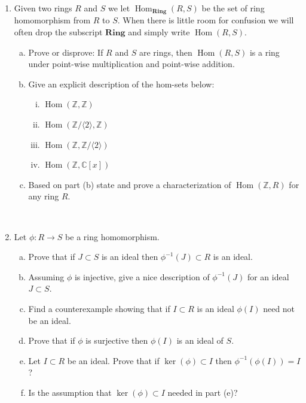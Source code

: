 \documentclass[12pt]{amsart}
\newcommand{\ZZ}{\mathbb{Z}}
\newcommand{\CC}{\mathbb{C}}
\newcommand{\Ring}{\textbf{Ring}}
\newcommand{\Hom}{\operatorname{Hom}}
\renewcommand{\ker}{\operatorname{ker}}
\begin{document}
\begin{enumerate}
	\item Given two rings $R$ and $S$ we let $\Hom_{\Ring}(R,S)$ be the set of ring homomorphism from $R$ to $S$. When there is little room for confusion we will often drop the subscript $\Ring$ and simply write $\Hom(R,S)$. 
	\begin{enumerate}[(a)]
		\item Prove or disprove: If $R$ and $S$ are rings, then $\Hom(R,S)$ is a ring under point-wise multiplication and point-wise addition. 
		\item Give an explicit description of the hom-sets below:
		\begin{enumerate}[(i)]
			\item $\Hom(\ZZ, \ZZ)$
			\item $\Hom(\ZZ/\langle 2 \rangle, \ZZ)$
			\item $\Hom(\ZZ, \ZZ/\langle 2 \rangle)$
			\item $\Hom(\ZZ, \CC[x])$
		\end{enumerate}
		\item Based on part (b) state and prove a characterization of $\Hom(\ZZ,R)$ for any ring $R$. 
	\end{enumerate}
	\ \\
		
	\item Let $\phi:R \to S$ be a ring homomorphism.
	\begin{enumerate}[(a)]
		\item Prove that if $J \subset S$ is an ideal then $\phi^{-1}(J) \subset R$ is an ideal.
		\item Assuming $\phi$ is injective, give a nice description of $\phi^{-1}(J)$ for an ideal $J \subset S$. 
		\item Find a counterexample showing that if $I \subset R$ is an ideal $\phi(I)$ need not be an ideal.
		\item Prove that if $\phi$ is surjective then $\phi(I)$ is an ideal of $S$. 
		\item Let $I \subset R$ be an ideal. Prove that if $\ker(\phi) \subset I$ then $\phi^{-1}(\phi(I))=I$? 
		\item Is the assumption that $\ker(\phi) \subset I$ needed in part (e)?
	\end{enumerate}
	
\end{enumerate}
\end{document}
